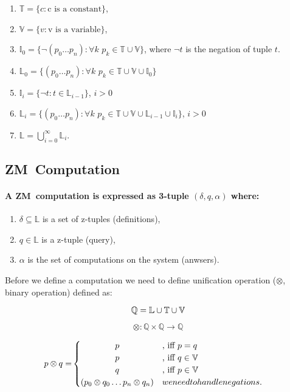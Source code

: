 \documentclass[11pt,a4paper]{report}
\newcommand{\zm}{ZM}
\newcommand{\unify}{\otimes}
\begin{document}
\begin{enumerate}
\item $\mathbb{T} = \{c: \text{c is a constant} \}$,
\item $\mathbb{V} = \{v: \text{v is a variable} \}$,
\item $\mathbb{I}_{0} = \{\neg (p_{0} \ldots p_{n}): \forall k \, \, p_{k} \in \mathbb{T} \cup \mathbb{V} \}$, where $\neg t$ is the negation of tuple $t$.
\item $\mathbb{L}_{0} = \{(p_{0} \ldots p_{n}) : \forall k \, \, p_{k} \in \mathbb{T} \cup \mathbb{V} \cup \mathbb{I}_{0} \}$

\item $\mathbb{I}_{i} = \{\neg t: t \in \mathbb{L}_{i-1}\}$, $i > 0$
\item $\mathbb{L}_{i} = \{(p_{0} \ldots p_{n}) : \forall k \, \, p_{k} \in \mathbb{T} \cup \mathbb{V} \cup \mathbb{L}_{i-1} \cup \mathbb{I}_{i} \}$, $i > 0$

\item $\mathbb{L} = \bigcup\limits_{i=0}^{\infty} \mathbb{L}_{i}$.
\end{enumerate}

\subsection{\zm\ Computation}
\paragraph{A \zm\ computation is expressed as 3-tuple $(\delta, q, \alpha)$ where:}

\begin{enumerate}
\item $\delta \subseteq \mathbb{L}$ is a set of z-tuples (definitions),
\item $q \in \mathbb{L}$ is a z-tuple (query),
\item $\alpha$ is the set of computations on the system (anwsers).
\end{enumerate}

Before we define a computation we need to define unification operation ($\unify$, binary operation) defined as:

\[
    \mathbb{Q} = \mathbb{L} \cup \mathbb{T} \cup \mathbb{V}\\
\]

\[
    \unify: \mathbb{Q} \times \mathbb{Q} \rightarrow \mathbb{Q}
\]

\begin{align}
    p \unify q = &  
    \begin{cases}
        \hfill p \hfill &\text{, iff } p = q\\
        \hfill p \hfill &\text{, iff } q \in \mathbb{V}\\
        \hfill q \hfill &\text{, iff } p \in \mathbb{V}\\
        \hfill (p_0 \unify q_{0} \ldots p_{n} \unify q_{n}) & we need to handle negations.\\
    \end{cases}
\end{align}
\end{document}

